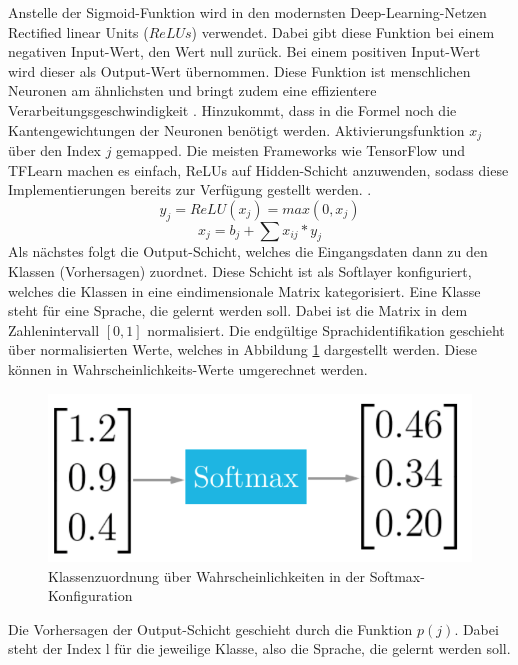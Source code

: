 Anstelle der Sigmoid-Funktion wird in den modernsten Deep-Learning-Netzen Rectified linear Units ($ReLUs$) verwendet. Dabei gibt diese Funktion bei einem negativen Input-Wert, den Wert null zurück. Bei einem positiven Input-Wert wird dieser als Output-Wert übernommen. Diese Funktion ist menschlichen Neuronen am ähnlichsten und bringt zudem eine effizientere Verarbeitungsgeschwindigkeit \cite{zeiler.2013}. Hinzukommt, dass in die Formel noch die Kantengewichtungen der Neuronen benötigt werden. Aktivierungsfunktion $x_{j}$ über den Index $j$ gemapped.
Die meisten Frameworks wie TensorFlow und TFLearn machen es einfach, ReLUs auf Hidden-Schicht anzuwenden, sodass diese Implementierungen bereits zur Verfügung gestellt werden. \cite{GonzalezDominguez.2015}.
\begin{equation*}
y_{j} = ReLU(x_{j}) = max(0,x_{j}) 
\label{eq:ReLU}
\end{equation*}
\begin{equation}
x_{ j } = b_{ j } + \sum{ }{ }{ x_{ ij } * y_{j}}
\label{eq:Gewichte}
\end{equation}
Als nächstes folgt die Output-Schicht, welches die Eingangsdaten dann zu den Klassen (Vorhersagen) zuordnet. Diese Schicht ist als Softlayer konfiguriert, welches die Klassen in eine eindimensionale Matrix kategorisiert. Eine Klasse steht für eine Sprache, die gelernt werden soll. Dabei ist die Matrix in dem Zahlenintervall $[0,1]$ normalisiert. Die endgültige Sprachidentifikation geschieht über normalisierten Werte, welches in Abbildung \ref{fig:soft} dargestellt werden. Diese können in Wahrscheinlichkeits-Werte umgerechnet werden\cite{Kulbear.2017}.
\begin{figure}[h!]
	\centering
	\includegraphics[width=0.7\linewidth]{images/softmax}
	\caption{Klassenzuordnung über Wahrscheinlichkeiten in der Softmax-Konfiguration \cite{Kulbear.2017}} %
	\label{fig:soft}
\end{figure}
 Die Vorhersagen der Output-Schicht geschieht durch die Funktion $p(j)$. Dabei steht der Index l für die jeweilige Klasse, also die Sprache, die gelernt werden soll.  
